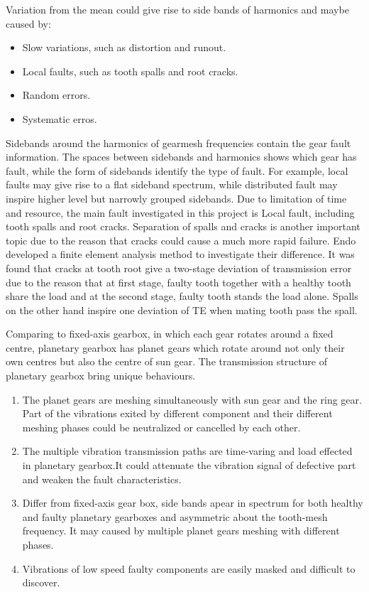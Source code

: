 Variation from the mean could give rise to side bands of harmonics and maybe caused by:
\begin{itemize}
\item Slow variations, such as distortion and runout.		
\item Local faults, such as tooth spalls and root cracks.		
\item Random errors.		
\item Systematic erros.
\end{itemize}
Sidebands around the harmonics of gearmesh frequencies contain the gear fault information. The spaces between sidebands and harmonics shows which gear has fault, while the form of sidebands identify the type of fault. For example, local faults may give rise to a flat sideband spectrum, while distributed fault may inspire higher level but narrowly grouped sidebands. 
Due to limitation of time and resource, the main fault investigated in this project is Local fault, including tooth spalls and root cracks.
Separation of spalls and cracks is another important topic due to the reason that cracks could cause a much more rapid failure. Endo\cite{Endo} developed a finite element analysis method to investigate their difference. It was found that cracks at tooth root give a two-stage deviation of transmission error due to the reason that at first stage, faulty tooth together with a healthy tooth share the load and at the second stage, faulty tooth stands the load alone. Spalls on the other hand inspire one deviation of TE when mating tooth pass the spall. 

Comparing to fixed-axis gearbox, in which each gear rotates around a fixed centre, planetary gearbox has planet gears which rotate around not only their own centres but also the centre of sun gear. The transmission structure of planetary gearbox bring unique behaviours. \cite{review}
\begin{enumerate}
\item The planet gears are meshing simultaneously with sun gear and the ring gear. Part of the vibrations exited by different component and their different meshing phases could be neutralized or cancelled by each other.

\item The multiple vibration transmission paths are time-varing and load effected in planetary gearbox.It could attenuate the vibration signal of defective part and weaken the fault characteristics.

\item Differ from fixed-axis gear box, side bands apear in spectrum for both healthy and faulty planetary gearboxes and asymmetric about the tooth-mesh frequency. It may caused by multiple planet gears meshing with different phases.

\item Vibrations of low speed faulty components are easily masked and difficult to discover.
\end{enumerate}


